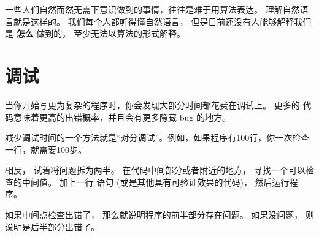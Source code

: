 一些人们自然而然无需下意识做到的事情，往往是难于用算法表达。 理解自然语言就是这样的。 我们每个人都听得懂自然语言， 但是目前还没有人能够解释我们是 {\bf 怎么} 做到的， 至少无法以算法的形式解释。

\section{调试}
\label{bisectbug}


当你开始写更为复杂的程序时，你会发现大部分时间都花费在调试上。 更多的
代码意味着更高的出错概率，并且会有更多隐藏 bug 的地方。
  


减少调试时间的一个方法就是“对分调试”。例如，如果程序有100行，你一次检查一行，就需要100步。


相反， 试着将问题拆为两半。 在代码中间部分或者附近的地方， 寻找一个可以检查的中间值。 加上一行  语句 (或是其他具有可验证效果的代码)， 然后运行程序。


如果中间点检查出错了， 那么就说明程序的前半部分存在问题。 如果没问题， 则说明是后半部分出错了。


